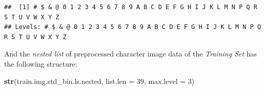 \documentclass[
]{report}
\newenvironment{Shaded}{\begin{snugshade}}{\end{snugshade}}
\newcommand{\AttributeTok}[1]{\textcolor[rgb]{0.13,0.29,0.53}{#1}}
\newcommand{\DecValTok}[1]{\textcolor[rgb]{0.00,0.00,0.81}{#1}}
\newcommand{\FunctionTok}[1]{\textcolor[rgb]{0.13,0.29,0.53}{\textbf{#1}}}
\newcommand{\NormalTok}[1]{#1}
\newcommand{\SpecialCharTok}[1]{\textcolor[rgb]{0.81,0.36,0.00}{\textbf{#1}}}
\begin{document}
\begin{Shaded}
\end{Shaded}

\footnotesize

\begin{verbatim}
##  [1] # $ & @ 0 1 2 3 4 5 6 7 8 9 A B C D E F G H I J K L M N P Q R S T U V W X Y Z
## Levels: # $ & @ 0 1 2 3 4 5 6 7 8 9 A B C D E F G H I J K L M N P Q R S T U V W X Y Z
\end{verbatim}

\normalsize

\protect{}\label{ds_overview.train.img.std_bin.ls.nested.structure}
And the \emph{nested list} of preprocessed character image data of the \emph{Training Set} has the following structure:

\begin{Shaded}
\begin{Highlighting}[]
\FunctionTok{str}\NormalTok{(train.img.std\_bin.ls.nested, }\AttributeTok{list.len =} \DecValTok{39}\NormalTok{, }\AttributeTok{max.level =} \DecValTok{3}\NormalTok{)}
\end{Highlighting}
\end{Shaded}

\footnotesize
\end{document}
